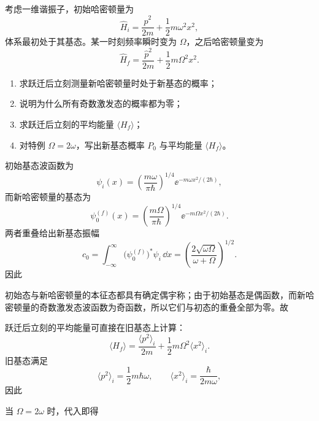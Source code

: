 ﻿

\begin{question}
考虑一维谐振子，初始哈密顿量为
\[
\hat H_i=\frac{\hat p^2}{2m}+\frac12 m\omega^2 x^2,
\]
体系最初处于其基态。某一时刻频率瞬时变为 $\Omega$，之后哈密顿量变为
\[
\hat H_f=\frac{\hat p^2}{2m}+\frac12 m\Omega^2 x^2.
\]

\begin{enumerate}[label=(\arabic*),leftmargin=2.5em]
  \item 求跃迁后立刻测量新哈密顿量时处于新基态的概率；
  \item 说明为什么所有奇数激发态的概率都为零；
  \item 求跃迁后立刻的平均能量 $\langle H_f\rangle$；
  \item 对特例 $\Omega=2\omega$，写出新基态概率 $P_0$ 与平均能量 $\langle H_f\rangle$。
\end{enumerate}

\begin{solution}
初始基态波函数为
\[
\psi_i(x)=\left(\frac{m\omega}{\pi\hbar}\right)^{1/4}\ee^{-m\omega x^2/(2\hbar)},
\]
而新哈密顿量的基态为
\[
\psi_0^{(f)}(x)=\left(\frac{m\Omega}{\pi\hbar}\right)^{1/4}\ee^{-m\Omega x^2/(2\hbar)}.
\]
两者重叠给出新基态振幅
\[
c_0=\int_{-\infty}^{\infty} \bigl(\psi_0^{(f)}\bigr)^*\psi_i\,\dd{x}
=\left(\frac{2\sqrt{\omega\Omega}}{\omega+\Omega}\right)^{1/2}.
\]
因此

初始态与新哈密顿量的本征态都具有确定偶宇称；由于初始基态是偶函数，而新哈密顿量的奇数激发态波函数为奇函数，所以它们与初态的重叠全部为零。故

跃迁后立刻的平均能量可直接在旧基态上计算：
\[
\langle H_f\rangle=\frac{\langle p^2\rangle_i}{2m}+\frac12 m\Omega^2\langle x^2\rangle_i.
\]
旧基态满足
\[
\langle p^2\rangle_i=\frac12 m\hbar\omega,
\qquad
\langle x^2\rangle_i=\frac{\hbar}{2m\omega},
\]
因此

当 $\Omega=2\omega$ 时，代入即得
\end{solution}
\end{question}

